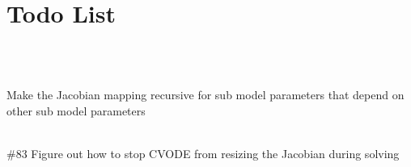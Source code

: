 \chapter{Todo List}
\hypertarget{todo}{}\label{todo}

\begin{DoxyRefList}
\item[Module \doxylink{namespacecamp__camp__box__model__data}{camp\+\_\+camp\+\_\+box\+\_\+model\+\_\+data} ]\hfill \\
\label{todo__todo000001}%
%
  
\item[Member \doxylink{camp__solver_8c_a5b485fa25356197023889f3795888e98}{get\+\_\+jac\+\_\+init} (Solver\+Data \texorpdfstring{$\ast$}{*}solver\+\_\+data)]\hfill \\
\label{todo__todo000003}%
%
Make the Jacobian mapping recursive for sub model parameters that depend on other sub model parameters  
\item[Member \doxylink{camp__solver_8c_a13451d507558a61a2353adfed58db468}{Jac} (realtype t, N\+\_\+\+Vector y, N\+\_\+\+Vector deriv, SUNMatrix J, void \texorpdfstring{$\ast$}{*}solver\+\_\+data, N\+\_\+\+Vector tmp1, N\+\_\+\+Vector tmp2, N\+\_\+\+Vector tmp3)]\hfill \\
\label{todo__todo000002}%
%
\#83 Figure out how to stop CVODE from resizing the Jacobian during solving 
\end{DoxyRefList}